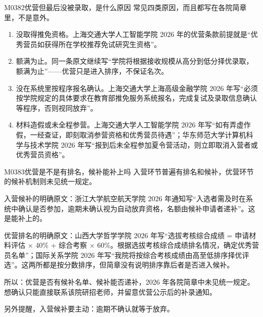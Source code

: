 \begin{qa}{M0382}{优营但最后没被录取，是什么原因}
常见四类原因，而且都写在各院简章里，不是意外。

\begin{enumerate}
  \item 没取得推免资格。上海交通大学人工智能学院 2026 年的优营条款前提就是“优秀营员如获得所在学校推荐免试研究生资格”。
  \item 额满为止。同一条原文继续写“学院将根据接收规模从高分到低分择优录取，额满为止”——优营只是进入排序，不保证名次。
  \item 没在系统里按程序报名确认。上海交通大学上海高级金融学院 2026 年写“必须按学院规定的具体要求在教育部推免服务系统报名，完成复试及录取信息确认等程序，否则视同放弃”。
  \item 材料造假或未全程参营。上海交通大学人工智能学院 2026 年写“如有弄虚作假，一经查证，即刻取消参营资格和优秀营员待遇”；华东师范大学计算机科学与技术学院 2026 年写“报到后未全程参加夏令营活动，则立即取消入营者或优秀营员资格”。
\end{enumerate}
\end{qa}

\begin{qa}{M0383}{优营是不是有排名，候补能补上吗}
入营环节普遍有排名和候补，优营环节的候补机制则未见统一规定。

入营候补的明确原文：浙江大学航空航天学院 2026 年通知写“入选者需及时在系统中确认是否参加，逾期未确认视为自动放弃资格，名额由候补申请者递补”。这是能补上的。

优营排名的明确原文：山西大学哲学学院 2026 年写“选拔考核综合成绩 = 申请材料评估 × 40\% + 综合考察 × 60\%。根据选拔考核综合成绩排名情况，确定优秀营员名单”；国际关系学院 2026 年写“我院将按综合考核成绩由高至低排序择优评选”。这两所都是按分数排序，但简章没有说明排序靠后者是否进入候补。

所以：优营是否有候补名单、候补能否递补，2026 年各院简章中未见统一规定。想确认只能直接联系该院研招老师，并留意优营公示后的补录通知。

另外提醒，入营候补要主动：逾期不确认就等于放弃。
\end{qa}

